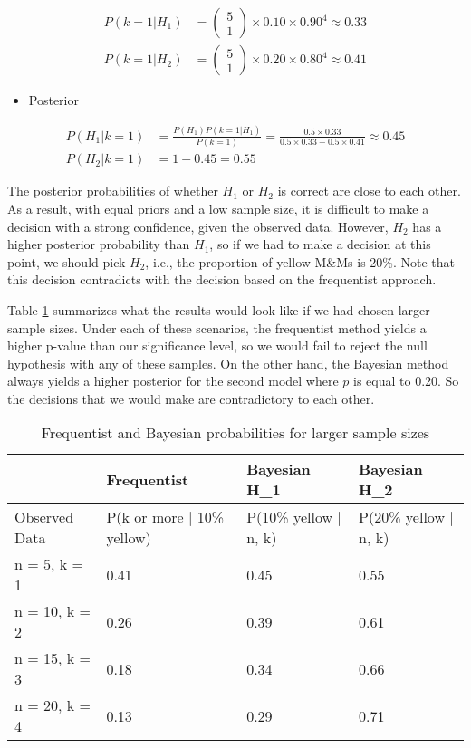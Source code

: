 \documentclass[]{book}
\providecommand{\tightlist}{%
  \setlength{\itemsep}{0pt}\setlength{\parskip}{0pt}}
\theoremstyle{definition}
\theoremstyle{definition}
\theoremstyle{definition}
\theoremstyle{remark}
\begin{document}
\[\begin{aligned}
P(k=1 | H_1) &= \left( \begin{array}{c} 5 \\ 1 \end{array} \right) \times 0.10 \times 0.90^4 \approx 0.33 \\
P(k=1 | H_2) &= \left( \begin{array}{c} 5 \\ 1 \end{array} \right) \times 0.20 \times 0.80^4 \approx 0.41
\end{aligned}\]

\begin{itemize}
\tightlist
\item
  Posterior
\end{itemize}

\[\begin{aligned}
P(H_1 | k=1) &= \frac{P(H_1)P(k=1 | H_1)}{P(k=1)} = \frac{0.5 \times 0.33}{0.5 \times 0.33 + 0.5 \times 0.41} \approx 0.45 \\
P(H_2 | k=1) &= 1 - 0.45 = 0.55
\end{aligned}\]

The posterior probabilities of whether \(H_1\) or \(H_2\) is correct are
close to each other. As a result, with equal priors and a low sample
size, it is difficult to make a decision with a strong confidence, given
the observed data. However, \(H_2\) has a higher posterior probability
than \(H_1\), so if we had to make a decision at this point, we should
pick \(H_2\), i.e., the proportion of yellow M\&Ms is 20\%. Note that
this decision contradicts with the decision based on the frequentist
approach.

Table \ref{tab:freq-vs-bayes} summarizes what the results would look
like if we had chosen larger sample sizes. Under each of these
scenarios, the frequentist method yields a higher p-value than our
significance level, so we would fail to reject the null hypothesis with
any of these samples. On the other hand, the Bayesian method always
yields a higher posterior for the second model where \(p\) is equal to
0.20. So the decisions that we would make are contradictory to each
other.

\begin{table}

\caption{\label{tab:freq-vs-bayes}Frequentist and Bayesian probabilities for larger sample sizes}
\centering
\begin{tabular}[t]{llll}
\toprule
 & Frequentist & Bayesian H\_1 & Bayesian H\_2\\
\midrule
Observed Data & P(k or more | 10\% yellow) & P(10\% yellow | n, k) & P(20\% yellow | n, k)\\
n = 5, k = 1 & 0.41 & 0.45 & 0.55\\
n = 10, k = 2 & 0.26 & 0.39 & 0.61\\
n = 15, k = 3 & 0.18 & 0.34 & 0.66\\
n = 20, k = 4 & 0.13 & 0.29 & 0.71\\
\bottomrule
\end{tabular}
\end{table}
\end{document}
